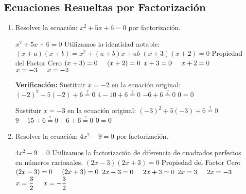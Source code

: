 \documentclass[letterpaper, 10pt, oneside]{book}
\begin{document}
	\subsection{Ecuaciones Resueltas por Factorización}
	\begin{enumerate}
		\item Resolver la ecuación: $x^2+5x+6=0$ por factorización.
		
		\begin{tcolorbox}[title=Solución, colback=white]
			$x^2+5x+6=0$\newline
			Utilizamos la identidad notable: $(x+a)(x+b)=x^2+(a+b)x+ab$\newline
			$(x+3)(x+2)=0$\newline
			Propiedad del Factor Cero\newline
			$(x+3)=0 \hspace{5mm} (x+2)=0$\newline
			$x+3=0 \hspace{5mm} x+2=0$\newline
			$x=-3 \hspace{5mm} x=-2$
			
			\vspace{10mm}
			\textbf{Verificación:}\newline
			Sustituir $x=-2$ en la ecuación original:\newline
			$(-2)^2+5(-2)+6 \overset{?}{=}0$\newline
			$4-10+6 \overset{?}{=} 0$\newline
			$-6+6\overset{?}{=}0$\newline
			$0=0$\newline
			
			Sustituir $x=-3$ en la ecuación original:\newline
			$(-3)^2+5(-3)+6 \overset{?}{=}0$\newline
			$9-15+6 \overset{?}{=} 0$\newline
			$-6+6\overset{?}{=}0$\newline
			$0=0$
		\end{tcolorbox}
		\item Resolver la ecuación: $4x^2-9=0$ por factorización. 
		
		\begin{tcolorbox}[title=Solución, colback=white]
			$4x^2-9=0$\newline
			Utilizamos la factorización de diferencia de cuadrados perfectos en números racionales.\newline 
			$(2x-3)(2x+3)=0$\newline
			Propiedad del Factor Cero\newline
			$(2x-3)=0 \hspace{5mm} (2x+3)=0$\newline
			$2x-3=0 \hspace{5mm} 2x+3=0$\newline
			$2x=3 \hspace{5mm} 2x=-3$\newline
			$\displaystyle{x=\frac{3}{2} \hspace{5mm} x=-\frac{3}{2}}$
		\end{tcolorbox}
	\end{enumerate}
\end{document}
